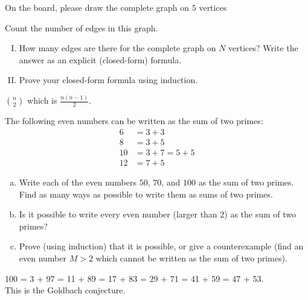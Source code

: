 \documentclass[11pt]{exam}
\begin{document}
\begin{questions}
\question
On the board, please draw the complete graph on $5$ vertices 

 
Count the number of edges in this graph.

\begin{enumerate}[I.)]
\item How many edges are there for the complete graph on $N$ vertices? Write the answer as an explicit (closed-form) formula.
\item Prove your closed-form formula using induction.
\end{enumerate}

\begin{solution}
${n \choose 2}$ which is $\displaystyle \frac{n(n-1)}{2}$.
\end{solution}


\question 
The following even numbers can be written as the sum of two primes:
\begin{align*}
6 &= 3 + 3 \\
8 &= 3 + 5 \\
10 &= 3 + 7 = 5 + 5 \\
12 &= 7 + 5
\end{align*}

\begin{enumerate}[a.]
\item Write each of the even numbers $50$, $70$, and $100$ as the sum of two primes. Find as many ways as possible to write them as sums of two primes.

\item Is it possible to write every even number (larger than $2$) as the sum of two primes? 
\item Prove (using induction) that it is possible, or give a counterexample (find an even number $M>2$ which cannot be written as the sum of two primes).
\end{enumerate}

\begin{solution}
100 = 3 + 97 = 11 + 89 = 17 + 83 = 29 + 71 = 41 + 59 = 47 + 53.\\
This is the Goldbach conjecture.
\end{solution}


\end{questions}
\end{document}

